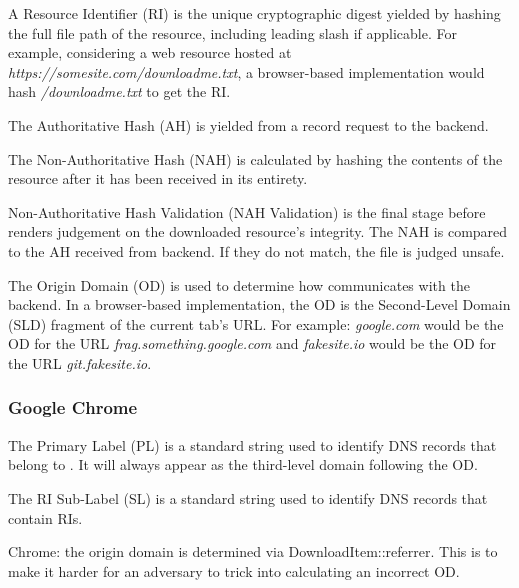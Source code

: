 A Resource Identifier (RI) is the unique cryptographic digest yielded by hashing
the full file path of the resource, including leading slash if applicable. For
example, considering a web resource hosted at
\textit{https://somesite.com/downloadme.txt}, a browser-based \SYSTEM{}
implementation would hash \textit{/downloadme.txt} to get the RI.

The Authoritative Hash (AH) is yielded from a record request to the backend.

The Non-Authoritative Hash (NAH) is calculated by hashing the contents of the
resource after it has been received in its entirety.

Non-Authoritative Hash Validation (NAH Validation) is the final stage before
\SYSTEM{} renders judgement on the downloaded resource's integrity. The NAH is
compared to the AH received from backend. If they do not match, the file is
judged unsafe.

The Origin Domain (OD) is used to determine how \SYSTEM{} communicates with the
backend. In a browser-based implementation, the OD is the Second-Level Domain
(SLD) fragment of the current tab's URL. For example:
\emph{google.com} would be the OD for the URL \emph{frag.something.google.com}
and \emph{fakesite.io} would be the OD for the URL \emph{git.fakesite.io}.

\subsubsection{Google Chrome}


The Primary Label (PL) is a standard string used to identify DNS records that
belong to \SYSTEM{}. It will always appear as the third-level domain following the
OD.

The RI Sub-Label (SL) is a standard string used to identify DNS records that
contain RIs.

Chrome: the origin domain is determined via DownloadItem::referrer. This is to
make it harder for an adversary to trick \SYSTEM{} into calculating an incorrect
OD.


